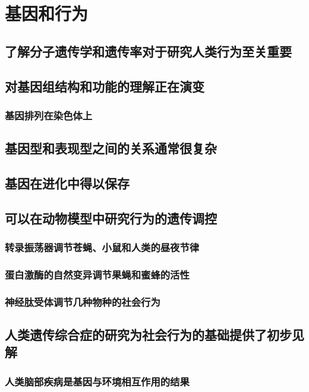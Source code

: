 \chapter{基因和行为}

\section{了解分子遗传学和遗传率对于研究人类行为至关重要}

\section{对基因组结构和功能的理解正在演变}
\subsection{基因排列在染色体上}

\section{基因型和表现型之间的关系通常很复杂}

\section{基因在进化中得以保存}

\section{可以在动物模型中研究行为的遗传调控}
\subsection{转录振荡器调节苍蝇、小鼠和人类的昼夜节律}
\subsection{蛋白激酶的自然变异调节果蝇和蜜蜂的活性}
\subsection{神经肽受体调节几种物种的社会行为}

\section{人类遗传综合症的研究为社会行为的基础提供了初步见解}
\subsection{人类脑部疾病是基因与环境相互作用的结果}
